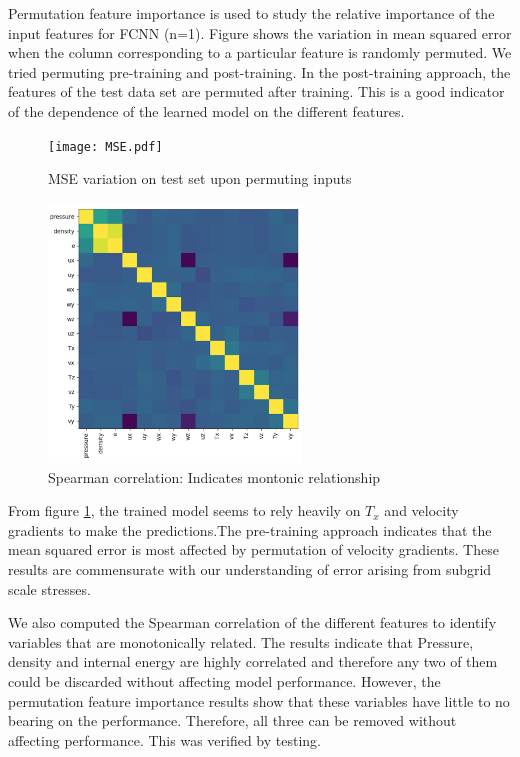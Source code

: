 \documentclass{article}
\begin{document}
Permutation feature importance is used to study the relative importance of the input features for FCNN (n=1). Figure \label{fig:perm} shows the variation in mean squared error when the column corresponding to a particular feature is randomly permuted. We tried permuting pre-training and post-training. In the post-training approach, the features of the test data set are permuted after training. This is a good indicator of the dependence of the learned model on the different features.

	\begin{figure}
	\centering
		\texttt{[image: MSE.pdf]}
		\caption{MSE variation on test set upon permuting inputs}
		\label{fig:perm}
	\end{figure}
	
		\begin{figure}
		\centering
    	\includegraphics[width=0.6\textwidth]{figures/spearman_heatmap.png}
    	\caption{Spearman correlation: Indicates montonic relationship}
    \end{figure}

From figure \ref{fig:perm}, the trained model seems to rely heavily on $T_x$ and velocity gradients to make the predictions.The pre-training approach indicates that the mean squared error is most affected by permutation of velocity gradients. These results are commensurate with our understanding of error arising from subgrid scale stresses.

We also computed the Spearman correlation of the different features to identify variables that are monotonically related. The results indicate that Pressure, density and internal energy are highly correlated and therefore any two of them could be discarded without affecting model performance. However, the permutation feature importance results show that these variables have little to no bearing on the performance. Therefore, all three can be removed without affecting performance. This was verified by testing. 
\end{document}
